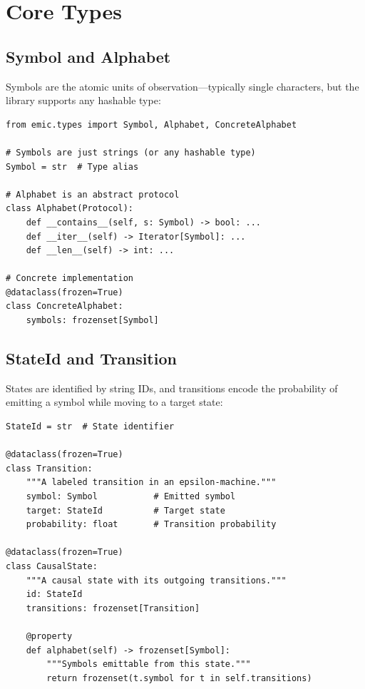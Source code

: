 \documentclass[11pt,a4paper]{report}
\theoremstyle{definition}
\theoremstyle{plain}
\begin{document}
\section{Core Types}

\subsection{Symbol and Alphabet}

Symbols are the atomic units of observation---typically single characters, but the library supports any hashable type:

\begin{lstlisting}[caption={Symbol and Alphabet types}]
from emic.types import Symbol, Alphabet, ConcreteAlphabet

# Symbols are just strings (or any hashable type)
Symbol = str  # Type alias

# Alphabet is an abstract protocol
class Alphabet(Protocol):
    def __contains__(self, s: Symbol) -> bool: ...
    def __iter__(self) -> Iterator[Symbol]: ...
    def __len__(self) -> int: ...

# Concrete implementation
@dataclass(frozen=True)
class ConcreteAlphabet:
    symbols: frozenset[Symbol]
\end{lstlisting}

\subsection{StateId and Transition}

States are identified by string IDs, and transitions encode the probability of emitting a symbol while moving to a target state:

\begin{lstlisting}[caption={State and transition types}]
StateId = str  # State identifier

@dataclass(frozen=True)
class Transition:
    """A labeled transition in an epsilon-machine."""
    symbol: Symbol           # Emitted symbol
    target: StateId          # Target state
    probability: float       # Transition probability

@dataclass(frozen=True)
class CausalState:
    """A causal state with its outgoing transitions."""
    id: StateId
    transitions: frozenset[Transition]

    @property
    def alphabet(self) -> frozenset[Symbol]:
        """Symbols emittable from this state."""
        return frozenset(t.symbol for t in self.transitions)
\end{lstlisting}
\end{document}
